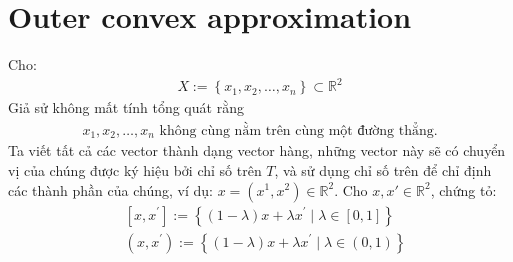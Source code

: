 \documentclass[12pt,a4paper,openany,oneside]{report}
\begin{document}
\section{Outer convex approximation}
Cho:
\begin{align} \label{ct2.1} 
	X:=\left\{x_1, x_2, \ldots, x_n\right\} \subset \mathbb{R}^2
\end{align}
Giả sử không mất tính tổng quát rằng
\begin{align} \label{ct2.2} 
	x_1, x_2, \ldots, x_n  \text{ không cùng nằm trên cùng một đường thẳng.}
\end{align}
Ta viết tất cả các vector thành dạng vector hàng, những vector này sẽ có chuyển vị của chúng được ký hiệu bởi chỉ số trên $T$, và sử dụng chỉ số trên để chỉ định các thành phần của chúng, ví dụ: $x = \left(x^1, x^2\right)\in\mathbb{R}^2$. Cho $x, x'\in\mathbb{R}^2$, chứng tỏ:
\begin{equation}\label{ct2.3}
	\begin{aligned}
		& {\left[x, x^{\prime}\right]:=\left\{(1-\lambda) x+\lambda x^{\prime} \mid \lambda \in[0,1]\right\}} \\
		& \left(x, x^{\prime}\right):=\left\{(1-\lambda) x+\lambda x^{\prime} \mid \lambda \in(0,1)\right\}
	\end{aligned}
\end{equation}
\end{document}
